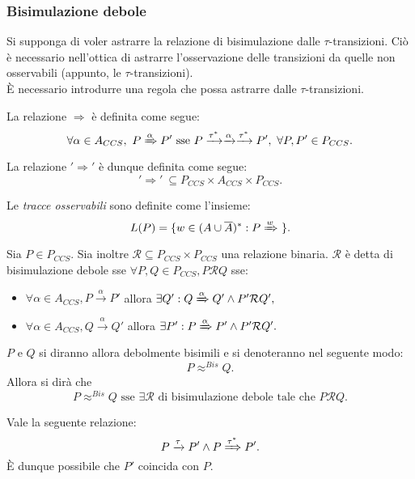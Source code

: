 \subsubsection{Bisimulazione debole}
Si supponga di voler astrarre la relazione di bisimulazione dalle $\tau$-transizioni. Ci\`o \`e necessario nell'ottica di astrarre l'osservazione delle transizioni da quelle non osservabili (appunto, le $\tau$-transizioni).\\
\`E necessario introdurre una regola che possa astrarre dalle $\tau$-transizioni. 
\begin{deff}
	La relazione $\Rightarrow$ \`e definita come segue: $$\forall \alpha \in A_{CCS},\ P \xRightarrow{\alpha} P' \text{ sse } P \xrightarrow{\tau^*} \xrightarrow{\alpha} \xrightarrow{\tau^*} P',\ \forall P, P' \in P_{CCS}.$$
\end{deff}
La relazione $'\Rightarrow'$ \`e dunque definita come segue: $$'\Rightarrow'\ \subseteq P_{CCS} \times A_{CCS} \times P_{CCS}.$$

\begin{deff}
	Le \emph{tracce osservabili} sono definite come l'insieme: $$L(P) = \{ w \in (A \cup \overline{A})^* : P \xRightarrow{w}\ \}.$$
\end{deff}

\begin{deff}
	Sia $P \in P_{CCS}.$ Sia inoltre $\mathcal{R} \subseteq P_{CCS} \times P_{CCS} $ una relazione binaria. $\mathcal{R}$ \`e detta di bisimulazione debole sse $ \forall P, Q \in P_{CCS}, P\mathcal{R}Q$ sse:
	\begin{itemize}
		\item $ \forall \alpha \in A_{CCS}, P \xrightarrow{\alpha} P'$ allora $\exists Q' : Q \xRightarrow{\alpha} Q' \land P'\mathcal{R}Q',$
		\item $ \forall \alpha \in A_{CCS}, Q \xrightarrow{\alpha} Q'$ allora $\exists P' : P \xRightarrow{\alpha} P' \land P'\mathcal{R}Q'.$
	\end{itemize}
	$P$ e $Q$ si diranno allora debolmente bisimili e si denoteranno nel seguente modo: $$P \approx^{Bis} Q.$$
	Allora si dir\`a che $$P \approx^{Bis} Q \text{ sse } \exists \mathcal{R} \text{ di bisimulazione debole tale che } P \mathcal{R} Q.$$
\end{deff}
\begin{lemma}
	Vale la seguente relazione: $$ P \xrightarrow{\tau} P' \land P \xRightarrow{\tau^*} P'.$$ \`E dunque possibile che $P'$ coincida con $P$.
\end{lemma}


